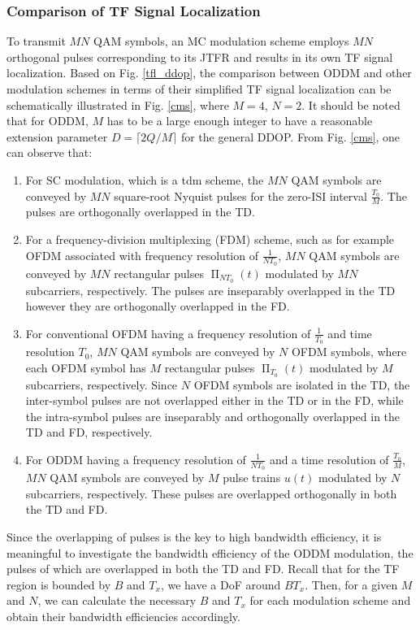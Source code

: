 \documentclass[journal]{IEEEtran}
\DeclareMathOperator{\rect}{\Pi}
\begin{document}
\subsubsection{Comparison of TF Signal Localization}
To transmit $MN$ QAM symbols, an MC modulation scheme employs $MN$ orthogonal pulses corresponding to its JTFR and results in its own TF signal localization. {Based on Fig. \ref{tfl_ddop}}, the comparison between ODDM and other modulation schemes in terms of their simplified TF signal localization can be schematically illustrated in Fig. \ref{cms}, where $M=4$, $N=2$.
It should be noted that for ODDM, $M$ has to be a large enough integer to have a reasonable extension parameter $D=\lceil 2Q/M \rceil$ for the general DDOP. From Fig. \ref{cms}, one can observe that:
\renewcommand{\labelenumi}{\arabic{enumi})}
\begin{enumerate}
  \item For SC modulation, which is a \ac{tdm} scheme, the $MN$ QAM symbols are conveyed by $MN$ square-root Nyquist pulses for the zero-ISI interval  $\frac{T_0}{M}$. The pulses are orthogonally overlapped in the TD.
  \item For a frequency-division multiplexing (FDM) scheme, such as for example OFDM associated  with frequency resolution of $\frac{1}{NT_0}$, $MN$ QAM symbols are conveyed by $MN$ rectangular pulses $\rect_{NT_0}(t)$ modulated by $MN$ subcarriers, respectively. The pulses are inseparably overlapped in the TD however they are orthogonally overlapped in the FD.
  \item For conventional OFDM having a frequency resolution of $\frac{1}{T_0}$ and time resolution $T_0$, $MN$ QAM symbols are conveyed by $N$ OFDM symbols, where each OFDM symbol has $M$ rectangular pulses $\rect_{T_0}(t)$ modulated by $M$ subcarriers, respectively. Since $N$ OFDM symbols are isolated in the TD, the inter-symbol pulses {are not overlapped either in the TD or in the FD}, while the intra-symbol pulses are inseparably and orthogonally overlapped in the TD and FD, respectively.
  \item For ODDM having a frequency resolution of $\frac{1}{NT_0}$ and a time resolution of $\frac{T_0}{M}$, $MN$ QAM symbols are conveyed by $M$ pulse trains $u(t)$ modulated by $N$ subcarriers, respectively. These pulses are overlapped orthogonally in both the TD and FD.
\end{enumerate}



Since the overlapping of pulses is the key to high bandwidth efficiency\cite{ofdm_oqam_chang_66,tlomcm_95}, it is meaningful to investigate the bandwidth efficiency of the ODDM modulation, the pulses of which are overlapped in both the TD and FD.
Recall that for the TF region is bounded by $B$ and $T_x$,
we have a DoF around $BT_x$. Then, for a given $M$ and $N$, we can calculate the necessary $B$ and $T_x$ for each modulation scheme and obtain their bandwidth efficiencies accordingly.
\end{document}
